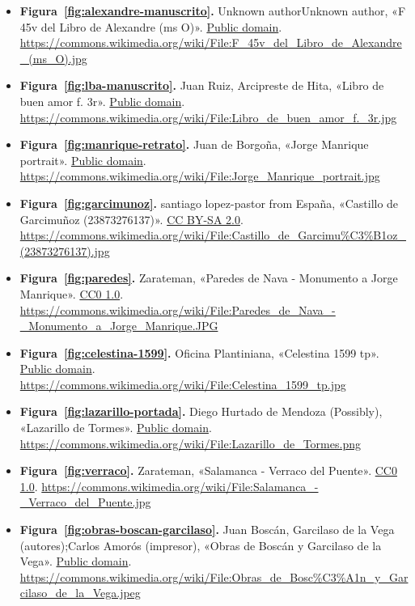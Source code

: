 \documentclass{book}
\begin{document}
\begin{itemize}
\item \textbf{Figura~\ref{fig:alexandre-manuscrito}.} Unknown authorUnknown author, «F 45v del Libro de Alexandre (ms O)». \href{https://creativecommons.org/publicdomain/mark/1.0/}{Public domain}. \url{https://commons.wikimedia.org/wiki/File:F_45v_del_Libro_de_Alexandre_(ms_O).jpg}
\item \textbf{Figura~\ref{fig:lba-manuscrito}.} Juan Ruiz, Arcipreste de Hita, «Libro de buen amor f. 3r». \href{https://creativecommons.org/publicdomain/mark/1.0/}{Public domain}. \url{https://commons.wikimedia.org/wiki/File:Libro_de_buen_amor_f._3r.jpg}
\item \textbf{Figura~\ref{fig:manrique-retrato}.} Juan de Borgoña, «Jorge Manrique portrait». \href{https://creativecommons.org/publicdomain/mark/1.0/}{Public domain}. \url{https://commons.wikimedia.org/wiki/File:Jorge_Manrique_portrait.jpg}
\item \textbf{Figura~\ref{fig:garcimunoz}.} santiago lopez-pastor from España, «Castillo de Garcimuñoz (23873276137)». \href{https://creativecommons.org/licenses/by-sa/2.0/}{CC BY-SA 2.0}. \url{https://commons.wikimedia.org/wiki/File:Castillo_de_Garcimu%C3%B1oz_(23873276137).jpg}
\item \textbf{Figura~\ref{fig:paredes}.} Zarateman, «Paredes de Nava - Monumento a Jorge Manrique». \href{https://creativecommons.org/publicdomain/zero/1.0/}{CC0 1.0}. \url{https://commons.wikimedia.org/wiki/File:Paredes_de_Nava_-_Monumento_a_Jorge_Manrique.JPG}
\item \textbf{Figura~\ref{fig:celestina-1599}.} Oficina Plantiniana, «Celestina 1599 tp». \href{https://creativecommons.org/publicdomain/mark/1.0/}{Public domain}. \url{https://commons.wikimedia.org/wiki/File:Celestina_1599_tp.jpg}
\item \textbf{Figura~\ref{fig:lazarillo-portada}.} Diego Hurtado de Mendoza (Possibly), «Lazarillo de Tormes». \href{https://creativecommons.org/publicdomain/mark/1.0/}{Public domain}. \url{https://commons.wikimedia.org/wiki/File:Lazarillo_de_Tormes.png}
\item \textbf{Figura~\ref{fig:verraco}.} Zarateman, «Salamanca - Verraco del Puente». \href{https://creativecommons.org/publicdomain/zero/1.0/}{CC0 1.0}. \url{https://commons.wikimedia.org/wiki/File:Salamanca_-_Verraco_del_Puente.jpg}
\item \textbf{Figura~\ref{fig:obras-boscan-garcilaso}.} Juan Boscán, Garcilaso de la Vega (autores);Carlos Amorós (impresor), «Obras de Boscán y Garcilaso de la Vega». \href{https://creativecommons.org/publicdomain/mark/1.0/}{Public domain}. \url{https://commons.wikimedia.org/wiki/File:Obras_de_Bosc%C3%A1n_y_Garcilaso_de_la_Vega.jpeg}

\end{itemize}
\end{document}

